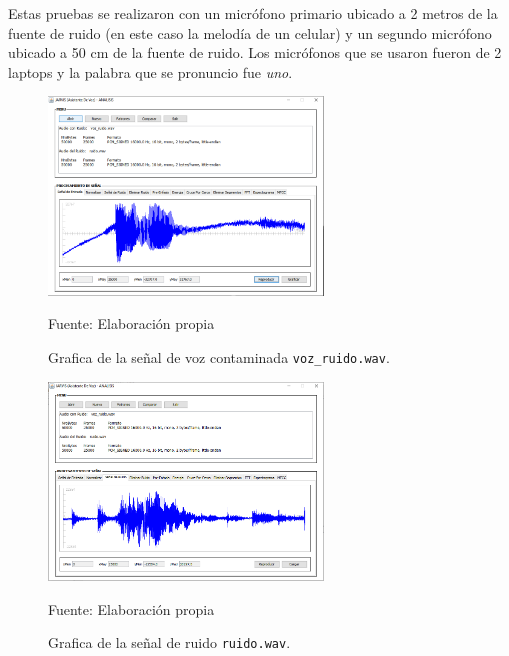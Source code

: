 \vskip 0.5cm
Estas pruebas se realizaron con un micrófono primario ubicado a 2 metros de la fuente de ruido (en este caso la melodía de un celular) y un segundo micrófono ubicado a 50 cm de la fuente de ruido. Los micrófonos que se usaron fueron de 2 laptops y la palabra que se pronuncio fue \textit{uno}.

\begin{figure}[H]
\begin{center}
\includegraphics[width=0.65\textwidth]{Imagenes/Cap3/image077}
\end{center}
\begin{center}
\vskip -0.5cm
\caption{\small{Grafica de la señal de voz contaminada \texttt{voz\_ruido.wav}.}}
\label{fig:figura3.77}
{\small{Fuente: Elaboración propia}}
\end{center}
\end{figure}

\vskip -1cm

\begin{figure}[H]
\begin{center}
\includegraphics[width=0.65\textwidth]{Imagenes/Cap3/image078}
\end{center}
\begin{center}
\vskip -0.5cm
\caption{\small{Grafica de la señal de ruido \texttt{ruido.wav}.}}
\label{fig:figura3.78}
{\small{Fuente: Elaboración propia}}
\end{center}
\end{figure}

